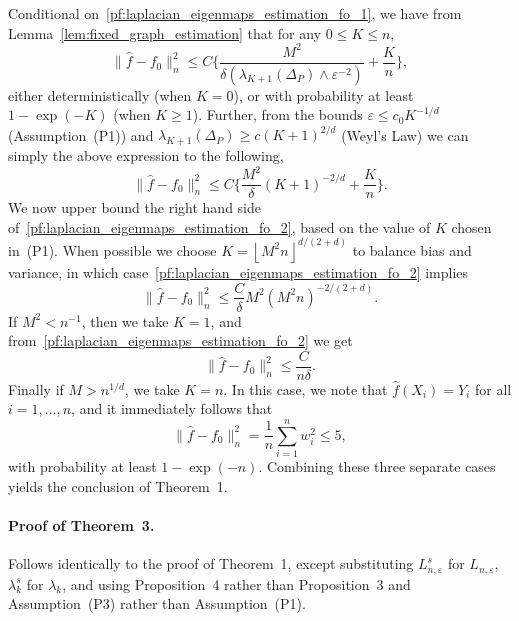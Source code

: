 \documentclass[aos]{imsart}
\theoremstyle{plain}
\theoremstyle{definition}
\theoremstyle{remark}
\newcommand{\wh}[1]{\widehat{#1}}
\newcommand{\floor}[1]{\left\lfloor #1 \right\rfloor}
\newcommand{\1}{\mathbf{1}}
\begin{document}
Conditional on~\eqref{pf:laplacian_eigenmaps_estimation_fo_1}, we have from Lemma~\ref{lem:fixed_graph_estimation} that for any $0 \leq K \leq n$,
\begin{equation*}
\|\wh{f} - f_0\|_n^2 \leq C\biggl\{\frac{M^2}{\delta (\lambda_{K + 1}(\Delta_P) \wedge \varepsilon^{-2})} + \frac{K}{n}\biggr\},
\end{equation*}
either deterministically (when $K = 0$), or with probability at least $1 - \exp(-K)$ (when $K \geq 1$). Further, from the bounds $\varepsilon \leq c_0 K^{-1/d}$ (Assumption~(P1)) and $\lambda_{K + 1}(\Delta_P) \geq c (K + 1)^{2/d}$ (Weyl's Law) we can simply the above expression to the following,
\begin{equation}
\label{pf:laplacian_eigenmaps_estimation_fo_2}
\|\wh{f} - f_0\|_n^2 \leq C\biggl\{\frac{M^2}{\delta}(K + 1)^{-2/d} + \frac{K}{n}\biggr\}.
\end{equation}
We now upper bound the right hand side of~\eqref{pf:laplacian_eigenmaps_estimation_fo_2}, based on the value of $K$ chosen in~(P1).  When possible we choose $K = \floor{M^2n}^{d/(2 + d)}$ to balance bias and variance, in which case~\eqref{pf:laplacian_eigenmaps_estimation_fo_2} implies
\begin{equation*}
\|\wh{f} - f_0\|_n^2 \leq \frac{C}{\delta} M^2 (M^2n)^{-2/(2 + d)}.
\end{equation*}
If $M^2 < n^{-1}$, then we take $K = 1$, and from~\eqref{pf:laplacian_eigenmaps_estimation_fo_2} we get
\begin{equation*}
\|\wh{f} - f_0\|_n^2 \leq \frac{C}{n\delta}.
\end{equation*}
Finally if $M > n^{1/d}$, we take $K = n$. In this case, we note that $\wh{f}(X_i) = Y_i$ for all $i = 1,\ldots,n$, and it immediately follows that
\begin{equation*}
\|\wh{f} - f_0\|_n^2 = \frac{1}{n}\sum_{i = 1}^{n} w_i^2 \leq 5,
\end{equation*}
with probability at least $1 - \exp(-n)$. Combining these three separate cases yields the conclusion of Theorem~1. 


\paragraph{Proof of Theorem~3.}
Follows identically to the proof of Theorem~1, except substituting $L_{n,\varepsilon}^s$ for $L_{n,\varepsilon}$, $\lambda_k^s$ for $\lambda_k$, and using Proposition~4 rather than Proposition~3 and Assumption~(P3) rather than Assumption~(P1).
\end{document}
